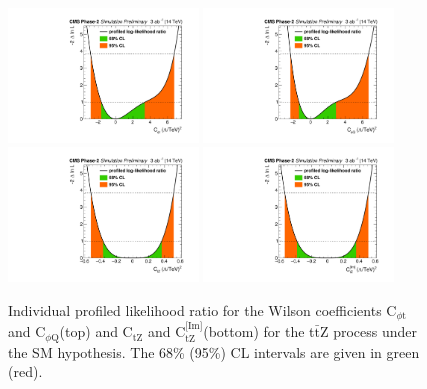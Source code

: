 \documentclass[letterpaper,11pt]{article}
\def\ttZ{t$\bar{\text{t}}$Z\xspace}
\def\ctZ{C$_\text{tZ}$\xspace}
\def\ctZI{C$_\text{tZ}^\text{[Im]}$\xspace}
\def\cpt{C$_{\phi \text{t}}$\xspace}
\def\cpQM{C$_{\phi \text{Q}}$\xspace}
\begin{document}
\begin{figure}[tbp]
  \centering
    \includegraphics[trim={0.4cm 0.cm 0.8cm 0.cm},clip,width=0.45\textwidth]{Figures/cpt_lumi3000_14TeV_CMScombine_r1_fullUnc.pdf}
    \includegraphics[trim={0.4cm 0.cm 0.8cm 0.cm},clip,width=0.45\textwidth]{Figures/cpQM_lumi3000_14TeV_CMScombine_r1_fullUnc.pdf}
    \includegraphics[trim={0.4cm 0.cm 0.8cm 0.cm},clip,width=0.45\textwidth]{Figures/ctZ_lumi3000_14TeV_CMScombine_r1_fullUnc.pdf}
    \includegraphics[trim={0.4cm 0.cm 0.8cm 0.cm},clip,width=0.45\textwidth]{Figures/ctZI_lumi3000_14TeV_CMScombine_r1_fullUnc.pdf}
  \caption{Individual profiled likelihood ratio for the Wilson coefficients \cpt and \cpQM (top) and \ctZ and \ctZI (bottom) for the \ttZ process under the SM hypothesis.
           The 68\% (95\%) CL intervals are given in green (red).
           }
  \label{fig:ttZ_1Dprofnll}
\end{figure}
\end{document}
